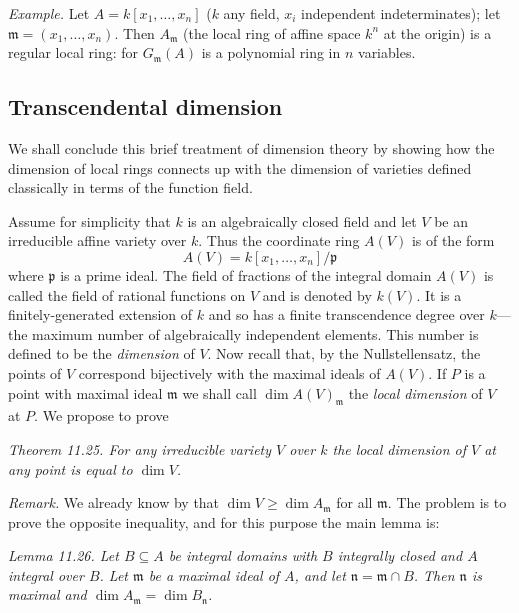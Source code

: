\textit{Example.} Let $A=k[x_1,\ldots,x_n]$ ($k$ any field, $x_i$ independent indeterminates); let $\mathfrak m=(x_1,\ldots,x_n)$. Then $A_{\mathfrak m}$ (the local ring of affine space $k^n$ at the origin) is a regular local ring: for $G_{\mathfrak m}(A)$ is a polynomial ring in $n$ variables.

\subsection{Transcendental dimension}

We shall conclude this brief treatment of dimension theory by showing how the dimension of local rings connects up with the dimension of varieties defined classically in terms of the function field.

Assume for simplicity that $k$ is an algebraically closed field and let $V$ be an irreducible affine variety over $k$. Thus the coordinate ring $A(V)$ is of the form
\[
 A(V)=k[x_1,\ldots,x_n]/\mathfrak p
\]
where $\mathfrak p$ is a prime ideal. The field of fractions of the integral domain $A(V)$ is called the field of rational functions on $V$ and is denoted by $k(V)$. It is a finitely-generated extension of $k$ and so has a finite transcendence degree over $k$---the maximum number of algebraically independent elements. This number is defined to be the \textit{dimension} of $V$. Now recall that, by the Nullstellensatz, the points of $V$ correspond bijectively with the maximal ideals of $A(V)$. If $P$ is a point with maximal ideal $\mathfrak m$ we shall call $\dim A(V)_{\mathfrak m}$ the \textit{local dimension} of $V$ at $P$. We propose to prove

\medskip
\noindent\textit{Theorem 11.25. For any irreducible variety $V$ over $k$ the local dimension of $V$ at any point is equal to $\dim V$.}

\textit{Remark.} We already know by  that $\dim V\geq\dim A_{\mathfrak m}$ for all $\mathfrak m$. The problem is to prove the opposite inequality, and for this purpose the main lemma is:

\medskip
\noindent\textit{Lemma 11.26. Let $B\subseteq A$ be integral domains with $B$ integrally closed and $A$ integral over $B$. Let $\mathfrak m$ be a maximal ideal of $A$, and let $\mathfrak n=\mathfrak m\cap B$. Then $\mathfrak n$ is maximal and $\dim A_{\mathfrak m}=\dim B_{\mathfrak n}$.}


